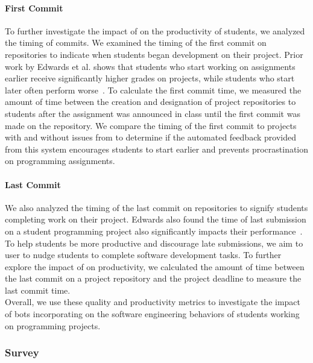 \paragraph*{First Commit} To further investigate the impact of \tooltwo on the productivity of students, we analyzed the timing of commits. We examined the timing of the first commit on repositories to indicate when students began development on their project. Prior work by Edwards et al. shows that students who start working on assignments earlier receive significantly higher grades on projects, while students who start later often perform worse~\cite{Edwards09Behaviors}. To calculate the first commit time, we measured the amount of time between the creation and designation of project repositories to students after the assignment was announced in class until the first commit was made on the repository. We compare the timing of the first commit to projects with and without issues from \tooltwo to determine if the automated feedback provided from this system encourages students to start earlier and prevents procrastination on programming assignments.

\paragraph*{Last Commit}

We also analyzed the timing of the last commit on repositories to signify students completing work on their project. Edwards also found the time of last submission on a student programming project also significantly impacts their performance~\cite{Edwards09Behaviors}. To help students be more productive and discourage late submissions, we aim to user \tooltwo to nudge students to complete software development tasks. To further explore the impact of \framework on productivity, we calculated the amount of time between the last commit on a project repository and the project deadline to measure the last commit time. \\

Overall, we use these quality and productivity metrics to investigate the impact of bots incorporating \framework on the software engineering behaviors of students working on programming projects.

\subsubsection{Survey}
 

